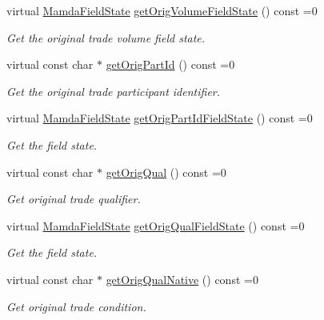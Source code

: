 \begin{CompactItemize}
virtual \hyperlink{namespaceWombat_93aac974f2ab713554fd12a1fa3b7d2a}{Mamda\-Field\-State} \hyperlink{classWombat_1_1MamdaTradeCorrection_83d22071b9cc7efd25faa237b4cdee22}{get\-Orig\-Volume\-Field\-State} () const =0
\begin{CompactList}\small\item\em Get the original trade volume field state. \item\end{CompactList}\item 
virtual const char $\ast$ \hyperlink{classWombat_1_1MamdaTradeCorrection_f0e85b637a8f2c26d4b7e4b1247e56c0}{get\-Orig\-Part\-Id} () const =0
\begin{CompactList}\small\item\em Get the original trade participant identifier. \item\end{CompactList}\item 
virtual \hyperlink{namespaceWombat_93aac974f2ab713554fd12a1fa3b7d2a}{Mamda\-Field\-State} \hyperlink{classWombat_1_1MamdaTradeCorrection_ce8b05826fc7de81ec9597ce8aef8203}{get\-Orig\-Part\-Id\-Field\-State} () const =0
\begin{CompactList}\small\item\em Get the field state. \item\end{CompactList}\item 
virtual const char $\ast$ \hyperlink{classWombat_1_1MamdaTradeCorrection_0a9dcb7daee1eb859f9d70020e7ca24e}{get\-Orig\-Qual} () const =0
\begin{CompactList}\small\item\em Get original trade qualifier. \item\end{CompactList}\item 
virtual \hyperlink{namespaceWombat_93aac974f2ab713554fd12a1fa3b7d2a}{Mamda\-Field\-State} \hyperlink{classWombat_1_1MamdaTradeCorrection_c197a0361fdc66023e813926ad7c950c}{get\-Orig\-Qual\-Field\-State} () const =0
\begin{CompactList}\small\item\em Get the field state. \item\end{CompactList}\item 
virtual const char $\ast$ \hyperlink{classWombat_1_1MamdaTradeCorrection_f75ee18edce1de13881f96c558f06b68}{get\-Orig\-Qual\-Native} () const =0
\begin{CompactList}\small\item\em Get original trade condition. \item\end{CompactList}\item 

\end{CompactItemize}
